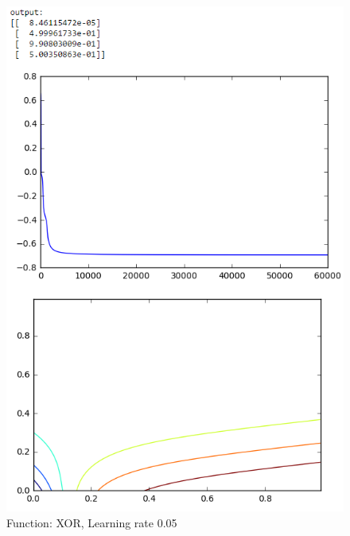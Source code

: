 \documentclass[11pt]{article}
\begin{document}
\begin{figure}[H]
	\centering
	\includegraphics[width=0.7\linewidth]{xor_lr005}
	\caption{Function: XOR, Learning rate 0.05}
	\label{fig:xorlr005}
\end{figure}
\end{document}
